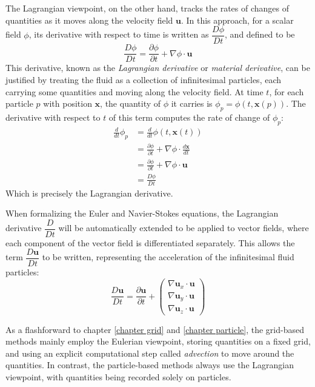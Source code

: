 The Lagrangian viewpoint, on the other hand, tracks the rates of changes of quantities as it moves along the velocity field $\textbf{u}$. In this approach, for a scalar field $\phi$, its derivative with respect to time is written as $\dfrac{D\phi}{Dt}$, and defined to be
$$
\frac{D\phi}{Dt} = \frac{\partial\phi}{\partial t} + \nabla \phi \cdot \textbf{u}
$$ 
This derivative, known as the \textit{Lagrangian derivative} or \textit{material derivative}, can be justified by treating the fluid as a collection of infinitesimal particles, each carrying some quantities and moving along the velocity field. At time $t$, for each particle $p$ with position $\textbf{x}$, the quantity of $\phi$ it carries is $\phi_p = \phi(t,\textbf{x}(p))$. The derivative with respect to $t$ of this term computes the rate of change of $\phi _p$:
$$
\begin{aligned}
    \frac{d}{dt} \phi_p
        &= \frac{d}{dt} \phi(t,\textbf{x}(t)) \\
        &= \frac{\partial \phi}{\partial t} + \nabla \phi \cdot \frac{d\textbf{x}}{dt} \\ 
        &= \frac{\partial \phi}{\partial t} + \nabla \phi \cdot \textbf{u} \\
        &=\frac{D\phi}{Dt}
\end{aligned}
$$
Which is precisely the Lagrangian derivative.

When formalizing the Euler and Navier-Stokes equations, the Lagrangian derivative $\dfrac{D}{Dt}$ will be automatically extended to be applied to vector fields, where each component of the vector field is differentiated separately. This allows the term $\dfrac{D\textbf{u}}{Dt}$ to be written, representing the acceleration of the infinitesimal fluid particles:
\begin{equation}
    \label{Du/Dt}
    \frac{D\textbf{u}}{Dt} = \frac{\partial\textbf{u}}{\partial t}
    + \begin{pmatrix}
       \nabla \textbf{u}_x  \cdot \textbf{u}\\
        \nabla \textbf{u}_y \cdot \textbf{u}\\
        \nabla \textbf{u}_z \cdot \textbf{u}
     \end{pmatrix}
\end{equation}


As a flashforward to chapter \ref{chapter grid} and \ref{chapter particle}, the grid-based methods mainly employ the Eulerian viewpoint, storing quantities on a fixed grid, and using an explicit computational step called \textit{advection} to move around the quantities. In contrast, the particle-based methods always use the Lagrangian viewpoint, with quantities being recorded solely on particles.










